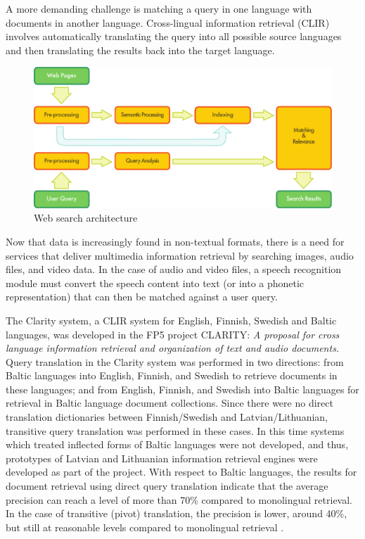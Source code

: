\begin{multicols}{2}
A more demanding challenge is matching a query in one language with documents in another language.
Cross-lingual information retrieval (CLIR) involves automatically translating the query into all possible source languages and then translating the results back into the target language.
\begin{figure}[htb]
  \center
  \includegraphics[width=\textwidth]{../_media/english/web_search_architecture}
  \caption{Web search architecture}
  \label{fig:websearcharch_en}
 \end{figure}
Now that data is increasingly found in non-textual formats, there is a need for services that deliver multimedia information retrieval by searching images, audio files, and video data.
In the case of audio and video files, a speech recognition module must convert the speech content into text (or into a phonetic representation) that can then be matched against a user query.

The Clarity system, a CLIR system for English, Finnish, Swedish and Baltic languages, was developed in the FP5 project CLARITY: \textit{A proposal for cross language information retrieval and organization of text and audio documents.} Query translation in the Clarity system was performed in two directions: from Baltic languages into English, Finnish, and Swedish to retrieve documents in these languages; and from English, Finnish, and Swedish into Baltic languages for retrieval in Baltic language document collections.
Since there were no direct translation dictionaries between Finnish/Swedish and Latvian/Lithuanian, transitive query translation was performed in these cases.
In this time systems which treated inflected forms of Baltic languages were not developed, and thus, prototypes of Latvian and Lithuanian information retrieval engines were developed as part of the project.
With respect to Baltic languages, the results for document retrieval using direct query translation indicate that the average precision can reach a level of more than 70\% compared to monolingual retrieval.
In the case of transitive (pivot) translation, the precision is lower, around 40\%, but still at reasonable levels compared to monolingual retrieval \cite{meta18}.


\end{multicols}
